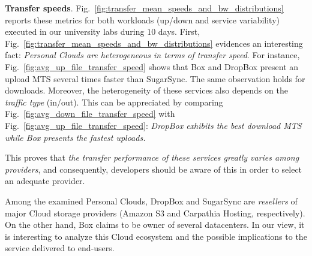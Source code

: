 \noindent\textbf{Transfer speeds}. Fig.~\ref{fig:transfer_mean_speeds_and_bw_distributions} 
reports these metrics for both workloads (up/down and service
variability) executed in our university labs during $10$ days.
First, Fig.~\ref{fig:transfer_mean_speeds_and_bw_distributions} 
evidences an interesting fact: \textit{Personal Clouds 
are heterogeneous in terms of transfer speed}.
For instance, Fig.~\ref{fig:avg_up_file_transfer_speed} 
shows that Box and DropBox present an upload MTS 
several times faster than SugarSync. The same observation holds for
downloads. Moreover, the heterogeneity of these services also depends
on the \textit{traffic type} (in/out). This can be appreciated by
comparing Fig.~\ref{fig:avg_down_file_transfer_speed} 
with Fig.~\ref{fig:avg_up_file_transfer_speed}: \textit{DropBox exhibits
the best download MTS while Box presents the fastest 
uploads.}

This proves that \textit{the transfer performance of these services greatly varies among providers}, and
consequently, developers should be aware of this in order to select an adequate provider. 

Among the examined Personal Clouds, DropBox and SugarSync 
are \textit{resellers} of major Cloud storage providers (Amazon S3 
and Carpathia Hosting, respectively). On the other hand, Box claims to be owner of several
datacenters. In our view, it is interesting to analyze this 
Cloud ecosystem and the possible implications to the service delivered to end-users.


